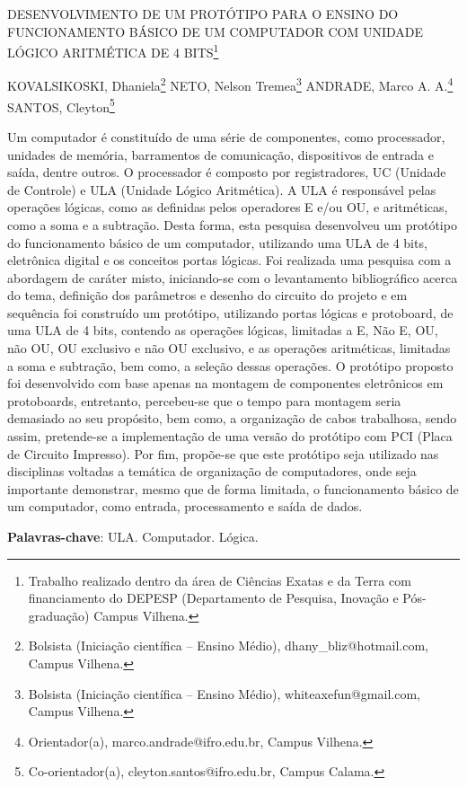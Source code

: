 \documentclass[article,12pt,onesidea,4paper,english,brazil]{abntex2}
\begin{document}
	
	
	\frenchspacing 
	
	\begin{center}
		\LARGE DESENVOLVIMENTO DE UM PROTÓTIPO PARA O ENSINO DO FUNCIONAMENTO BÁSICO DE UM COMPUTADOR COM UNIDADE LÓGICO ARITMÉTICA DE 4 BITS\footnote{Trabalho realizado dentro da área de Ciências Exatas e da Terra com financiamento do DEPESP (Departamento de Pesquisa, Inovação e Pós-graduação) Campus Vilhena.}
		
		\normalsize
		KOVALSIKOSKI, Dhaniela\footnote{Bolsista (Iniciação científica – Ensino Médio), dhany\_bliz@hotmail.com, Campus Vilhena.} 
	NETO, Nelson Tremea\footnote{Bolsista (Iniciação científica – Ensino Médio), whiteaxefun@gmail.com, Campus Vilhena.} 
	ANDRADE, Marco A. A.\footnote{Orientador(a), marco.andrade@ifro.edu.br, Campus Vilhena.} 
	SANTOS, Cleyton\footnote{Co-orientador(a), cleyton.santos@ifro.edu.br, Campus Calama.} 
	\end{center}
	
	\noindent Um computador é constituído de uma série de componentes, como processador, unidades de memória, barramentos de comunicação, dispositivos de entrada e saída, dentre outros. O processador é composto por registradores, UC (Unidade de Controle) e ULA (Unidade Lógico Aritmética). A ULA é responsável pelas operações lógicas, como as definidas pelos operadores E e/ou OU, e aritméticas, como a soma e a subtração. Desta forma, esta pesquisa desenvolveu um protótipo do funcionamento básico de um computador, utilizando uma ULA de 4 bits, eletrônica digital e os conceitos portas lógicas. Foi realizada uma pesquisa com a abordagem de caráter misto, iniciando-se com o levantamento bibliográfico acerca do tema, definição dos parâmetros e desenho do circuito do projeto e em sequência foi construído um protótipo, utilizando portas lógicas e protoboard, de uma ULA de 4 bits, contendo as operações lógicas, limitadas a E, Não E, OU, não OU, OU exclusivo e não OU exclusivo, e as operações aritméticas, limitadas a soma e subtração, bem como, a seleção dessas operações. O protótipo proposto foi desenvolvido com base apenas na montagem de componentes eletrônicos em protoboards, entretanto, percebeu-se que o tempo para montagem seria demasiado ao seu propósito, bem como, a organização de cabos trabalhosa, sendo assim, pretende-se a implementação de uma versão do protótipo com PCI (Placa de Circuito Impresso). Por fim, propõe-se que este protótipo seja utilizado nas disciplinas voltadas a temática de organização de computadores, onde seja importante demonstrar, mesmo que de forma limitada, o funcionamento básico de um computador, como entrada, processamento e saída de dados.
	
	\vspace{\onelineskip}
	
	\noindent
	\textbf{Palavras-chave}: ULA. Computador. Lógica.
	
\end{document}
